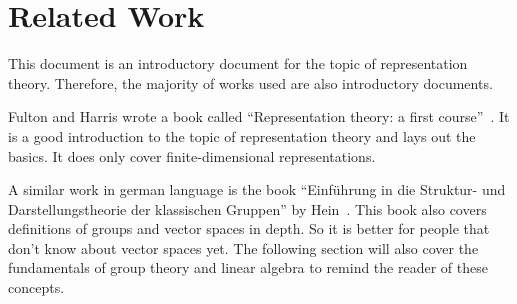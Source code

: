 \section{Related Work}

This document is an introductory document for the topic of representation theory.
Therefore, the majority of works used are also introductory documents.

Fulton and Harris wrote a book called ``Representation theory: a first course''~\cite{fulton2013}.
It is a good introduction to the topic of representation theory and lays out the basics.
It does only cover finite-dimensional representations.

A similar work in german language is the book ``Einführung in die Struktur- und Darstellungstheorie der klassischen Gruppen'' by Hein~\cite{hein2013}.
This book also covers definitions of groups and vector spaces in depth.
So it is better for people that don't know about vector spaces yet.
The following section will also cover the fundamentals of group theory and linear algebra to remind the reader of these concepts.
